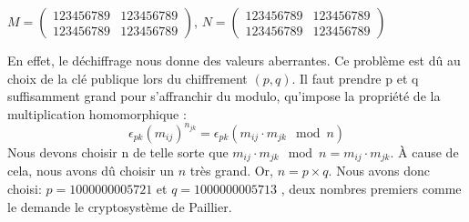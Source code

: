 $M = \begin{pmatrix} 123456789 & 123456789 \\ 123456789 & 123456789  \end{pmatrix}$,
$N = \begin{pmatrix} 123456789 & 123456789 \\ 123456789 & 123456789  \end{pmatrix}$
\vspace{0.5\baselineskip}

En effet, le déchiffrage nous donne des valeurs aberrantes. Ce problème est dû au choix de la clé publique lors du chiffrement $(p,q)$.
Il faut prendre p et q suffisamment grand pour s'affranchir du modulo, qu'impose la propriété de la multiplication homomorphique : 
\[
	\epsilon_{pk}(m_{ij})^{n_{jk}}=\epsilon_{pk}(m_{ij} \cdot m_{jk} \mod n)
\] 
Nous devons choisir n de telle sorte que $m_{ij} \cdot m_{jk} \mod n = m_{ij} \cdot m_{jk}$. \`A cause de cela, nous avons dû choisir un $n$ très grand. Or, $n = p \times q$.
Nous avons donc choisi: $p= 1000000005721$ et $q= 1000000005713$ , deux nombres premiers comme le demande le cryptosystème de Paillier.
